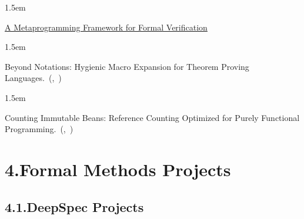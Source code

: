 \documentclass[12pt,twoside]{article}
\begin{document}
\begin{mddefinitions}

\begin{mdbmarginx}{}{}{}{1.5em}%
\begin{mddefdata}%

\href{https://pp.ipd.kit.edu/uploads/publikationen/ebner17meta.pdf}{A Metaprogramming Framework for Formal Verification}%
\end{mddefdata}%
\end{mdbmarginx}%

\begin{mdbmarginx}{}{}{}{1.5em}%
\begin{mddefdata}%

Beyond Notations: Hygienic Macro Expansion for Theorem Proving Languages.~(,~)%
\end{mddefdata}%
\end{mdbmarginx}%

\begin{mdbmarginx}{}{}{}{1.5em}%
\begin{mddefdata}%

Counting Immutable Beans: Reference Counting Optimized for Purely Functional Programming.~(,~)%
\end{mddefdata}%
\end{mdbmarginx}%
\end{mddefinitions}%

\section{4.\hspace*{0.5em}Formal Methods Projects}%

\subsection{4.1.\hspace*{0.5em}DeepSpec Projects}%
\end{document}
